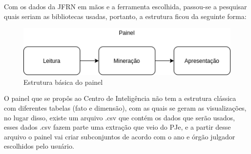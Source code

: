 Com os dados da JFRN em mãos e a ferramenta escolhida, passou-se a pesquisar quais seriam as bibliotecas usadas, portanto, a estrutura ficou da seguinte forma:

\begin{figure}[h]
	\centering
	\includegraphics[scale=0.65]{./figures/cap2/estrutura_painel.png}
	\caption{Estrutura básica do painel}
\end{figure}

O painel que se propôs ao Centro de Inteligência não tem a estrutura clássica com diferentes tabelas (fato e dimensão), com as quais se geram as visualizações, no lugar disso, existe um arquivo .csv que contém os dados que serão usados, esses dados .csv fazem parte uma extração que veio do PJe, e a partir desse arquivo o painel vai criar subconjuntos de acordo com o ano e órgão julgador escolhidos pelo usuário.